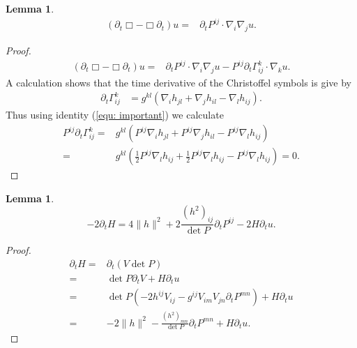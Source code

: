 \documentclass{amsart}
\newtheorem{lemma}[theorem]{Lemma}
\theoremstyle{definition}
\theoremstyle{remark}
\numberwithin{equation}{section}
\begin{document}
\begin{lemma}
\begin{align}
(\partial_t \Box-\Box\partial_t) u=&\partial_tP^{ij}\cdot\nabla_i\nabla_ju.
\end{align}
\end{lemma}
\begin{proof}
\begin{align*}
(\partial_t \Box-\Box \partial_t)u
=&\partial_tP^{ij}\cdot\nabla_i\nabla_ju-P^{ij}\partial_t\Gamma_{ij}^k\cdot\nabla_ku.
\end{align*}
A calculation shows that the time derivative of the Christoffel symbols is give by
\begin{align}
\partial_t \Gamma_{ij}^k&=g^{kl}\left(\nabla_ih_{jl}+\nabla_jh_{il}-\nabla_{l}h_{ij}\right).
\end{align}
Thus using identity (\ref{equ: important}) we calculate
\begin{align*}
P^{ij}\partial_t \Gamma_{ij}^k=&g^{kl}\left(P^{ij}\nabla_ih_{jl}+P^{ij}\nabla_jh_{il}-P^{ij}\nabla_{l}h_{ij}\right)\\
=&g^{kl}\left(\frac{1}{2}P^{ij}\nabla_lh_{ij}+\frac{1}{2}P^{ij}\nabla_lh_{ij}-P^{ij}\nabla_{l}h_{ij}\right)=0.
\end{align*}
\end{proof}
\begin{lemma}
\begin{equation}
-2\partial_tH=4\|h\|^2+2\frac{(h^2)_{ij}}{\det P}\partial_tP^{ij}-2H\partial_tu.
\end{equation}
\end{lemma}
\begin{proof}
\begin{align*}
\partial_tH=&\partial_t(V\det P)\\
=&\det P\partial_t V+H\partial_tu\\
=&\det P(-2h^{ij}V_{ij}-g^{ij}V_{im}V_{jn}\partial_tP^{mn})+H\partial_tu\\
=&-2\|h\|^2-\frac{(h^2)_{mn}}{\det P}\partial_tP^{mn}+H\partial_tu.
\end{align*}
\end{proof}
\end{document}
